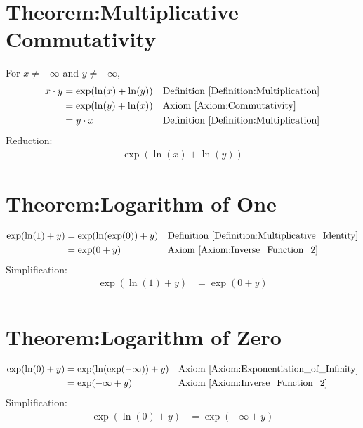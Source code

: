 \documentclass[12pt,a4paper]{report}
\begin{document}
\section{Theorem:Multiplicative Commutativity}
\label{Theorem:Multiplicative_Commutativity}
For $x \neq -\infty$ and $y \neq -\infty$,
\begin{align*}
x \cdot y
&= \exp(\ln(x) + \ln(y))
&& \text{Definition \ref{Definition:Multiplication}} \\
&= \exp(\ln(y) + \ln(x))
&& \text{Axiom \ref{Axiom:Commutativity}} \\
&= y \cdot x
&& \text{Definition \ref{Definition:Multiplication}} \\
\end{align*}
Reduction:
\begin{align*}
\exp(\ln(x) + \ln(y))
\end{align*}

\section{Theorem:Logarithm of One}
\label{Theorem:Logarithm_of_One}
\begin{align*}
\exp(\ln(1) + y)
&= \exp(\ln(\exp(0)) + y)
&& \text{Definition \ref{Definition:Multiplicative_Identity}} \\
&= \exp(0 + y)
&& \text{Axiom \ref{Axiom:Inverse_Function_2}} \\
\end{align*}
Simplification:
\begin{align*}
\exp(\ln(1) + y) &= \exp(0 + y) \\
\end{align*}

\section{Theorem:Logarithm of Zero}
\label{Theorem:Logarithm_of_Zero}
\begin{align*}
\exp(\ln(0) + y)
&= \exp(\ln(\exp(-\infty)) + y)
&& \text{Axiom \ref{Axiom:Exponentiation_of_Infinity}} \\
&= \exp(-\infty + y)
&& \text{Axiom \ref{Axiom:Inverse_Function_2}} \\
\end{align*}
Simplification:
\begin{align*}
\exp(\ln(0) + y) &= \exp(-\infty + y) \\
\end{align*}
\end{document}

